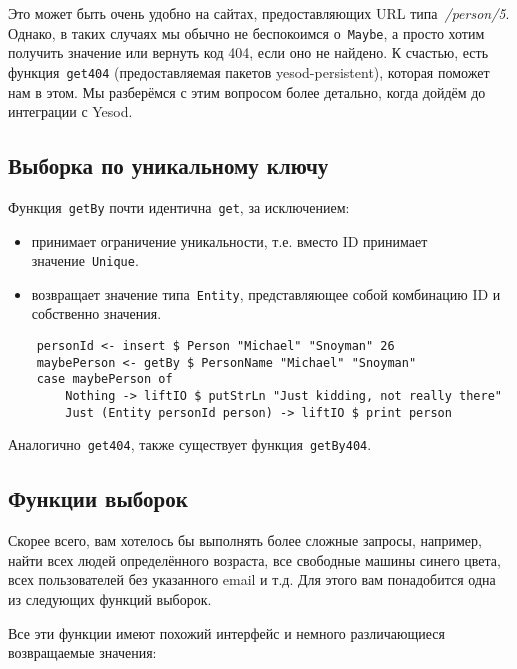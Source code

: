 Это может быть очень удобно на сайтах, предоставляющих URL
типа~\emph{/person/5}. Однако, в таких случаях мы обычно не беспокоимся
о~\lstinline'Maybe', а просто хотим получить значение или вернуть код 404, если
оно не найдено. К счастью, есть функция~\lstinline'get404' (предоставляемая
пакетов yesod-persistent), которая поможет нам в этом. Мы разберёмся с этим
вопросом более детально, когда дойдём до интеграции с Yesod.

\subsection{Выборка по уникальному ключу}

Функция~\lstinline'getBy' почти идентична~\lstinline'get', за исключением:
\begin{itemize}
    \item принимает ограничение уникальности, т.е. вместо ID принимает
        значение~\lstinline'Unique'.

    \item возвращает значение типа~\lstinline'Entity', представляющее собой
        комбинацию ID и собственно значения.
\end{itemize}

\begin{lstlisting}
    personId <- insert $ Person "Michael" "Snoyman" 26
    maybePerson <- getBy $ PersonName "Michael" "Snoyman"
    case maybePerson of
        Nothing -> liftIO $ putStrLn "Just kidding, not really there"
        Just (Entity personId person) -> liftIO $ print person
\end{lstlisting}

Аналогично~\lstinline'get404', также существует функция~\lstinline'getBy404'.

\subsection{Функции выборок}

Скорее всего, вам хотелось бы выполнять более сложные запросы, например, найти
всех людей определённого возраста, все свободные машины синего цвета, всех
пользователей без указанного email и т.д. Для этого вам понадобится одна из
следующих функций выборок.

Все эти функции имеют похожий интерфейс и немного различающиеся возвращаемые
значения:

